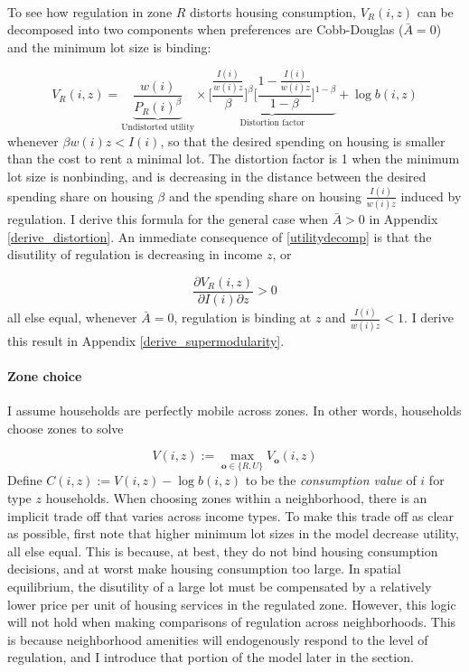 \documentclass[12pt]{article}
\begin{document}
	\paragraph*{}
	To see how regulation in zone $R$ distorts housing consumption, $V_{R}(i, z)$ can be decomposed into two components when preferences are Cobb-Douglas ($\bar{A} = 0$) and the minimum lot size is binding:
	
	\begin{equation}\label{utilitydecomp}
		V_{R}(i, z) = \underbrace{\frac{w(i)}{P_{R}(i)^{\beta}}}_{\text{Undistorted utility}}  \times \underbrace{\biggl[\frac{\frac{I(i)}{w(i)z}}{\beta}\biggl]^{\beta}\biggl[\frac{1- \frac{I(i)}{w(i)z}}{1-\beta}\biggl]^{1 - \beta}}_{\text{Distortion factor}} + \log b(i, z)
	\end{equation}
	whenever $\beta w(i)z < I(i)$, so that the desired spending on housing is smaller than the cost to rent a minimal lot. The distortion factor is 1 when the minimum lot size is nonbinding, and is decreasing in the distance between the desired spending share on housing $\beta$ and the spending share on housing $\frac{I(i)}{w(i)z}$ induced by regulation. I derive this formula for the general case when $\bar{A} > 0$ in Appendix \ref{derive_distortion}. An immediate consequence of \eqref{utilitydecomp} is that the disutility of regulation is decreasing in income $z$, or 
	
	\begin{equation}\label{supermodularity}
	\frac{\partial V_{R}(i, z)}{\partial I(i) \partial z} > 0 	
	\end{equation} 
	 all else equal, whenever $\bar{A} = 0$, regulation is binding at $z$ and $\frac{I(i)}{w(i)z} < 1$. I derive this result in Appendix \ref{derive_supermodularity}. 

	\paragraph*{Zone choice}
	I assume households are perfectly mobile across zones. In other words, households choose zones to solve 
	
	\begin{equation}\label{zonechoice}
		V(i, z) := \max_{\boldsymbol{o} \in \{R, U\}}V_{\boldsymbol{o}}(i, z)
	\end{equation}
	Define $C(i, z) := V(i, z) - \log b(i, z)$ to be the \textit{consumption value} of $i$ for type $z$ households. When choosing zones within a neighborhood, there is an implicit trade off that varies across income types. To make this trade off as clear as possible, first note that higher minimum lot sizes in the model decrease utility, all else equal. This is because, at best, they do not bind housing consumption decisions, and at worst make housing consumption too large. In spatial equilibrium, the disutility of a large lot must be compensated by a relatively lower price per unit of housing services in the regulated zone. However, this logic will not hold when making comparisons of regulation across neighborhoods. This is because neighborhood amenities will endogenously respond to the level of regulation, and I introduce that portion of the model later in the section. 
\end{document}
